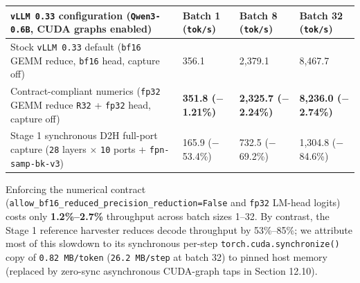 \documentclass[10pt]{article}
\begin{document}
\begin{center}\small
\begin{tabularx}{\linewidth}{YYYY}
\toprule
{}\textbf{\texttt{vLLM 0.\allowbreak{}33} configuration (\texttt{Qwen3-0.\allowbreak{}6B}, CUDA graphs enabled)} & {}\textbf{Batch 1 (\texttt{tok/s})} & {}\textbf{Batch 8 (\texttt{tok/s})} & {}\textbf{Batch 32 (\texttt{tok/s})} \\
\midrule
{}Stock \texttt{vLLM 0.\allowbreak{}33} default (\texttt{bf16} GEMM reduce, \texttt{bf16} head, capture off) & {}356.1 & {}2,379.1 & {}8,467.7 \\
{}Contract-compliant numerics (\texttt{fp32} GEMM reduce \texttt{R32} + \texttt{fp32} head, capture off) & {}\textbf{351.8 ($-$1.21\%)} & {}\textbf{2,325.7 ($-$2.24\%)} & {}\textbf{8,236.0 ($-$2.74\%)} \\
{}Stage 1 synchronous D2H full-port capture (\texttt{28} layers $\times$ \texttt{10} ports + \texttt{fpn-samp-bk-v3}) & {}165.9 ($-$53.4\%) & {}732.5 ($-$69.2\%) & {}1,304.8 ($-$84.6\%) \\
\bottomrule
\end{tabularx}
\end{center}

Enforcing the numerical contract (\texttt{allow\_\allowbreak{}bf16\_\allowbreak{}reduced\_\allowbreak{}precision\_\allowbreak{}reduction=False} and \texttt{fp32} LM-head logits) costs only \textbf{1.2\%--2.7\%} throughput across batch sizes 1--32. By contrast, the Stage 1 reference harvester reduces decode throughput by 53\%--85\%; we attribute most of this slowdown to its synchronous per-step \texttt{torch.\allowbreak{}cuda.\allowbreak{}synchronize()} copy of \texttt{0.\allowbreak{}82 MB/token} (\texttt{26.\allowbreak{}2 MB/step} at batch 32) to pinned host memory (replaced by zero-sync asynchronous CUDA-graph taps in Section 12.10).
\end{document}
